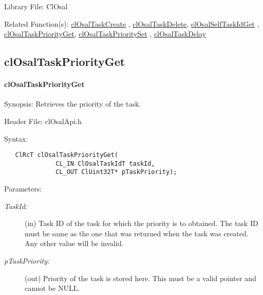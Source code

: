 \begin{Desc}
\item[Library File:]Cl\-Osal\end{Desc}
\begin{Desc}
\item[Related Function(s):]\hyperlink{pageosal103}{cl\-Osal\-Task\-Create} , \hyperlink{pageosal104}{cl\-Osal\-Task\-Delete}, 
\hyperlink{pageosal105}{cl\-Osal\-Self\-Task\-Id\-Get} , \hyperlink{pageosal107}{cl\-Osal\-Task\-Priority\-Get}, 
\hyperlink{pageosal108}{cl\-Osal\-Task\-Priority\-Set} , \hyperlink{pageosal109}{cl\-Osal\-Task\-Delay} \end{Desc}

\newpage
\subsection{clOsalTaskPriorityGet} 
\hypertarget{pageosal107}{}\paragraph{cl\-Osal\-Task\-Priority\-Get}\label{pageosal107}
\begin{Desc}
\item[Synopsis:]Retrieves the priority of the task.\end{Desc}
\begin{Desc}
\item[Header File:]clOsalApi.h\end{Desc}
\begin{Desc}
\item[Syntax:]

\footnotesize\begin{verbatim}   ClRcT clOsalTaskPriorityGet(
              CL_IN ClOsalTaskIdT taskId,
              CL_OUT ClUint32T* pTaskPriority);
\end{verbatim}
\normalsize
\end{Desc}
\begin{Desc}
\item[Parameters:]
\begin{description}
\item[{\em Task\-Id:}](in) Task ID of the task for which the priority is to obtained. The task ID must be same as the one that was returned when the
task was created. Any other value will be invalid.\item[{\em p\-Task\-Priority:}](out) Priority of the task is stored here. This must be a valid pointer and cannot be NULL.\end{description}
\end{Desc}
